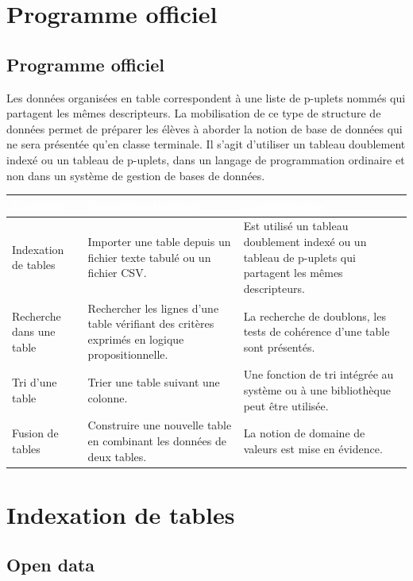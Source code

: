 \chapter*{Programme officiel}

\section*{Programme officiel}

Les données organisées en table correspondent à une liste de p-uplets nommés qui partagent les mêmes descripteurs. La mobilisation de ce type de structure de données permet de préparer les élèves à aborder la notion de base de données qui ne sera présentée qu'en classe terminale. Il s'agit d'utiliser un tableau doublement indexé ou un tableau de p-uplets, dans un langage de programmation ordinaire et non dans un système de gestion de bases de données.

{\centering\begin{tabular}{|L{3cm}|L{5.5cm}|L{6cm}|}\hline
{}\bfseries\textcolor{white}{Contenus}&
\bfseries\textcolor{white}{Capacités attendues}&
\bfseries\textcolor{white}{Commentaires}\\ \hline
Indexation de tables
&
Importer une table depuis un fichier texte tabulé ou un fichier CSV.
& Est utilisé un tableau doublement indexé ou un tableau de p-uplets qui partagent les mêmes descripteurs.\\ \hline
Recherche dans une table
&
Rechercher les lignes d'une table vérifiant des critères exprimés en logique propositionnelle.
&
La recherche de doublons, les tests de cohérence d'une table sont présentés.\\ \hline
Tri d'une table
&
Trier une table suivant une colonne.
&
Une fonction de tri intégrée au système ou à une bibliothèque peut être utilisée.\\ \hline
Fusion de tables
&
Construire une nouvelle table en combinant les données de deux tables.
&
La notion de domaine de valeurs est mise en évidence.\\ \hline
\end{tabular}\par}


\chapter{Indexation de tables}

\section{Open data}

